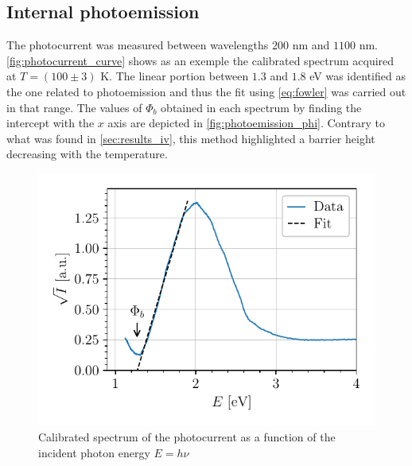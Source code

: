 \begin{figure}[htbp]
\begin{minipage}[t]{0.49\textwidth}
        \label{fig:richardson}
    \end{minipage}
\end{figure}

\subsection{Internal photoemission} \label{sec:results_photoemission}
The photocurrent was measured between wavelengths $200$ nm and $1100$ nm.
\autoref{fig:photocurrent_curve} shows as an exemple the calibrated spectrum acquired at $T = (100\pm3)$ K.
The linear portion between $1.3$ and $1.8$ eV was identified as the one related to photoemission and thus the fit using \autoref{eq:fowler} was carried out in that range.
The values of $\Phi_b$ obtained in each spectrum by finding the intercept with the $x$ axis are depicted in \autoref{fig:photoemission_phi}.
Contrary to what was found in  \autoref{sec:results_iv}, this method highlighted a barrier height decreasing with the temperature.



\begin{figure}[htbp]
    \centering
    \includegraphics[scale=1]{figures/photocurrent_curve.pdf}
    \caption{Calibrated spectrum of the photocurrent as a function of the incident photon energy $E=h\nu$}
    \label{fig:photocurrent_curve}
\end{figure}

